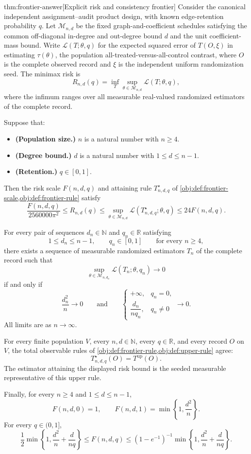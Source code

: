 \begin{theoremv}{thm:frontier-answer}[Explicit risk and consistency frontier]
Consider the canonical independent assignment--audit product design, with known edge-retention probability \(q\). Let \(\mathcal M_{n,d}\) be the fixed graph-and-coefficient schedules satisfying the common off-diagonal in-degree and out-degree bound \(d\) and the unit coefficient-mass bound. Write \(\mathcal L(T;\theta,q)\) for the expected squared error of \(T(O,\xi)\) in estimating \(\tau(\theta)\), the population all-treated-versus-all-control contrast, where \(O\) is the complete observed record and \(\xi\) is the independent uniform randomization seed. The minimax risk is
\[
R_{n,d}(q)
=
\inf_T\sup_{\theta\in\mathcal M_{n,d}}\mathcal L(T;\theta,q),
\]
where the infimum ranges over all measurable real-valued randomized estimators of the complete record.

Suppose that:
\begin{itemize}
\item \textbf{(Population size.)} \(n\) is a natural number with \(n\ge4\).
\item \textbf{(Degree bound.)} \(d\) is a natural number with \(1\le d\le n-1\).
\item \textbf{(Retention.)} \(q\in[0,1]\).
\end{itemize}
Then the risk scale \(F(n,d,q)\) and attaining rule \(T^\star_{n,d,q}\) of \cref{obj:def:frontier-scale,obj:def:frontier-rule} satisfy
\[
\frac{F(n,d,q)}{2560000\pi^2}
\le R_{n,d}(q)
\le
\sup_{\theta\in\mathcal M_{n,d}}
\mathcal L(T^\star_{n,d,q};\theta,q)
\le 24F(n,d,q).
\]

For every pair of sequences \(d_n\in\mathbb N\) and \(q_n\in\mathbb R\) satisfying
\[
1\le d_n\le n-1,\qquad q_n\in[0,1]
\qquad\text{for every }n\ge4,
\]
there exists a sequence of measurable randomized estimators \(T_n\) of the complete record such that
\[
\sup_{\theta\in\mathcal M_{n,d_n}}
\mathcal L(T_n;\theta,q_n)\longrightarrow0
\]
if and only if
\[
\frac{d_n^2}{n}\longrightarrow0
\qquad\text{and}\qquad
\begin{cases}
+\infty,&q_n=0,\\[2pt]
\dfrac{d_n}{nq_n},&q_n\ne0
\end{cases}
\longrightarrow0.
\]
All limits are as \(n\to\infty\).

For every finite population \(V\), every \(n,d\in\mathbb N\), every \(q\in\mathbb R\), and every record \(O\) on \(V\), the total observable rules of \cref{obj:def:frontier-rule,obj:def:upper-rule} agree:
\[
T^\star_{n,d,q}(O)=T^{\mathrm{up}}(O).
\]
The estimator attaining the displayed risk bound is the seeded measurable representative of this upper rule.

Finally, for every \(n\ge4\) and \(1\le d\le n-1\),
\[
F(n,d,0)=1,
\qquad
F(n,d,1)=\min\left\{1,\frac{d^2}{n}\right\}.
\]
For every \(q\in(0,1]\),
\[
\frac12\min\left\{1,\frac{d^2}{n}+\frac{d}{nq}\right\}
\le F(n,d,q)
\le
(1-e^{-1})^{-1}
\min\left\{1,\frac{d^2}{n}+\frac{d}{nq}\right\}.
\]
\end{theoremv}

